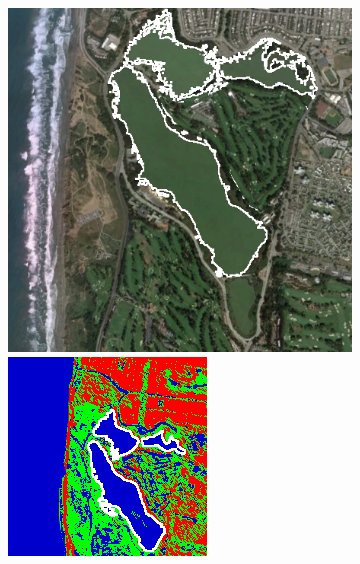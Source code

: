 \begin{figure}[tbp]
\begin{subfigure}[t]{0.19\textwidth}
\caption{}
\label{fig:cla2_b}
\end{subfigure}
\begin{subfigure}[t]{0.19\textwidth}
\includegraphics[width=\columnwidth]{Figures/ALOS2_SF_3Class/Lake} 
\vspace{0.2cm}
\includegraphics[width=\columnwidth]{Figures/ALOS2_SF_3Class/Lake_cl}

\end{subfigure}
\end{figure}
